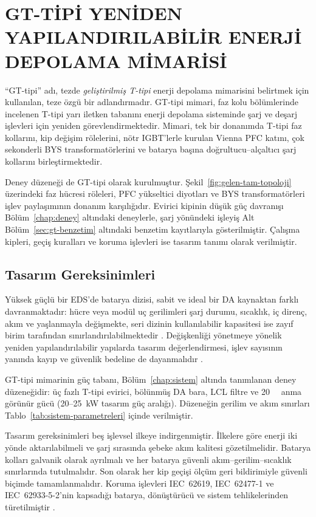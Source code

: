 \chapter{GT-TİPİ YENİDEN YAPILANDIRILABİLİR ENERJİ DEPOLAMA MİMARİSİ}
\label{chap:gttipi}

``GT-tipi'' adı, tezde \emph{geliştirilmiş T-tipi} enerji depolama mimarisini belirtmek için kullanılan, teze özgü bir adlandırmadır. GT-tipi mimari, faz kolu bölümlerinde incelenen T-tipi yarı iletken tabanını enerji depolama sisteminde şarj ve deşarj işlevleri için yeniden görevlendirmektedir. Mimari, tek bir donanımda T-tipi faz kollarını, kip değişim rölelerini, nötr IGBT'lerle kurulan Vienna PFC katını, çok sekonderli BYS transformatörlerini ve batarya başına doğrultucu--alçaltıcı şarj kollarını birleştirmektedir.

Deney düzeneği de GT-tipi olarak kurulmuştur. Şekil~\ref{fig:gelen-tam-topoloji} üzerindeki faz hücresi röleleri, PFC yükseltici diyotları ve BYS transformatörleri işlev paylaşımının donanım karşılığıdır. Evirici kipinin düşük güç davranışı Bölüm~\ref{chap:deney} altındaki deneylerle, şarj yönündeki işleyiş Alt Bölüm~\ref{sec:gt-benzetim} altındaki benzetim kayıtlarıyla gösterilmiştir. Çalışma kipleri, geçiş kuralları ve koruma işlevleri ise tasarım tanımı olarak verilmiştir.

\section{Tasarım Gereksinimleri}
\label{sec:gt-gereksinimler}

Yüksek güçlü bir EDS'de batarya dizisi, sabit ve ideal bir DA kaynaktan farklı davranmaktadır: hücre veya modül uç gerilimleri şarj durumu, sıcaklık, iç direnç, akım ve yaşlanmayla değişmekte, seri dizinin kullanılabilir kapasitesi ise zayıf birim tarafından sınırlandırılabilmektedir \citep{Plett2015,Hannan2017,Farakhor2023}. Değişkenliği yönetmeye yönelik yeniden yapılandırılabilir yapılarda tasarım değerlendirmesi, işlev sayısının yanında kayıp ve güvenlik bedeline de dayanmalıdır \citep{Momayyezan2016,Farakhor2023,Huang2024}.

GT-tipi mimarinin güç tabanı, Bölüm~\ref{chap:sistem} altında tanımlanan deney düzeneğidir: üç fazlı T-tipi evirici, bölünmüş DA bara, LCL filtre ve \SI{20}{\kilo\voltampere} anma görünür gücü (\num{20}--\SI{25}{\kilo\watt} tasarım güç aralığı). Düzeneğin gerilim ve akım sınırları Tablo~\ref{tab:sistem-parametreleri} içinde verilmiştir.

Tasarım gereksinimleri beş işlevsel ilkeye indirgenmiştir. İlkelere göre enerji iki yönde aktarılabilmeli ve şarj sırasında şebeke akım kalitesi gözetilmelidir. Batarya kolları galvanik olarak ayrılmalı ve her batarya güvenli akım--gerilim--sıcaklık sınırlarında tutulmalıdır. Son olarak her kip geçişi ölçüm geri bildirimiyle güvenli biçimde tamamlanmalıdır. Koruma işlevleri IEC~62619, IEC~62477-1 ve IEC~62933-5-2'nin kapsadığı batarya, dönüştürücü ve sistem tehlikelerinden türetilmiştir \citep{IEC62619,IEC62477,IEC62933_5_2}.

